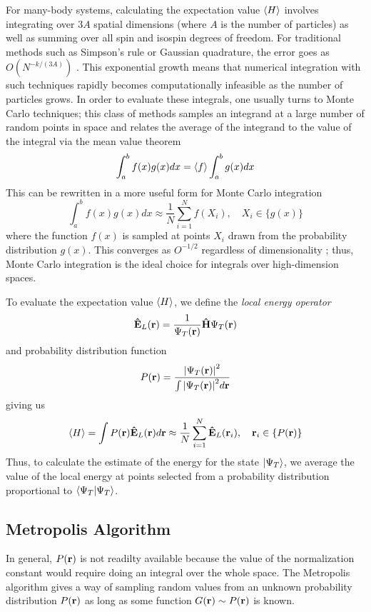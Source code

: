 \documentclass[aps,prl,preprint,groupedaddress]{revtex4-1}
\begin{document}
For many-body systems, calculating the expectation value \(\ev{H}\) involves integrating
over \(3A\) spatial dimensions (where \(A\) is the number of particles) as well as
summing over all spin and isospin degrees of freedom. For traditional methods such
as Simpson's rule or Gaussian quadrature, the error goes as \(O(N^{-k/(3A)})\)
\cite{hjorth-jensen_2013}. This exponential growth means that numerical integration
with such techniques rapidly becomes computationally infeasible as the number of
particles grows. In order to evaluate these integrals, one usually turns to Monte
Carlo techniques; this class of methods samples an integrand at a large number of
random points in space and relates the average of the integrand to the value of
the integral via the mean value theorem
\begin{equation*}
  \int_a^b f(x) g(x) dx = \expval{f} \int_a^b g(x) dx
\end{equation*}
This can be rewritten in a more useful form for Monte Carlo integration
\begin{equation*}
    \int_a^b f(x) g(x) dx \approx \frac{1}{N} \sum_{i=1}^N f(X_i), \quad X_i \in \{g(x)\}
\end{equation*}
where the function \(f(x)\) is sampled at points \(X_i\) drawn from the probability
distribution \(g(x)\). This converges as \(O^{-1/2}\) regardless of dimensionality
\cite{hjorth-jensen_2013}; thus, Monte Carlo integration is the ideal choice for
integrals over high-dimension spaces.

To evaluate the expectation value \(\ev{H}\), we define the \textit{local energy
operator} \[\vu{E}_L (\vb{r}) = \frac{1}{\Psi_T (\vb{r})} \vu{H} \Psi_T (\vb{r})\]
and probability distribution function
\[P(\vb{r}) = \frac{\qty|\Psi_T(\vb{r})|^2}{\int \qty|\Psi_T(\vb{r})|^2 d \vb{r}}\]
giving us
\[\ev{H} = \int P(\vb{r}) \vu{E}_L (\vb{r}) d \vb{r} \approx
  \frac{1}{N} \sum_{i=1}^N \vu{E}_L (\vb{r}_i), \quad \vb{r}_i \in \{P(\vb{r})\}\]
Thus, to calculate the estimate of the energy for the state \(\ket{\Psi_T}\), we
average the value of the local energy at points selected from a probability distribution
proportional to \(\braket{\Psi_T}\).

\subsection{Metropolis Algorithm}
In general, \(P(\vb{r})\) is not readilty available because the value of the
normalization constant would require doing an integral over the whole space.
The Metropolis algorithm gives a way of sampling random values from an unknown
probability distribution \(P(\vb{r})\) as long as some function \(G(\vb{r}) \sim
P(\vb{r)}\) is known.
\end{document}
